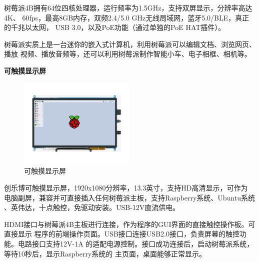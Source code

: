 \documentclass[UTF8,14pt]{article}
\newcommand\sectiontwo[1]{\centerline{\large{\bfseries{#1}}}}
\begin{document}
树莓派4B拥有64位四核处理器，运行频率为1.5GHz，支持双屏显示，分辨率高达4K、
60fps，最高8GB内存，双频2.4/5.0 GHz无线局域网，蓝牙5.0/BLE，真正的千兆以太网，
USB 3.0，以及PoE功能（通过单独的PoE HAT插件）。

树莓派实质上是一台迷你的嵌入式计算机，利用树莓派可以编辑文档、浏览网页、播放
视频、播放音频等，还可以利用树莓派制作智能小车、电子相框、相机等。

\sectiontwo{可触摸显示屏}
\begin{figure}%
	\vspace{-0.4cm}
	\centering
	\includegraphics[width=5.56cm]{figures/screen.pdf}
	\vspace{-10pt}
	\caption{可触摸显示屏}
	\vspace{-15pt}
\end{figure}
创乐博可触摸显示屏，1920x1080分辨率，13.3英寸，支持HD高清显示，可作为
电脑副屏，兼容并可直接插入任何树莓派主板，支持Raspberry系统、Ubuntu系统
、英伟达，十点触控，免驱动安装。USB-12V直流供电。

HDMI接口与树莓派4B主板进行连接，作为程序的GUI界面的直接触控操作板。可直接显示
程序的前端操作页面。USB接口连接USB2.0接口，负责屏幕的触控功能。电路接口支持12V-1A
的适配电源控制。接口成功连接后，启动树莓派系统，等待10秒后，显示Raspberry系统的
主页面，桌面能够正常显示。
\end{document}
